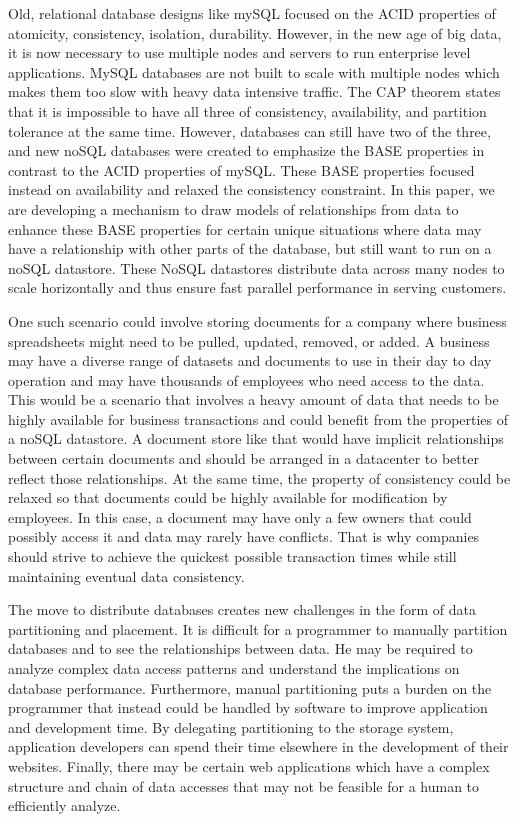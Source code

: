 \documentclass[10pt,final,journal]{IEEEtran}
\begin{document}
Old, relational database designs like mySQL focused on the ACID properties of atomicity, consistency, isolation, durability. However, in the new age of big data, it is now necessary to use multiple nodes and servers to run enterprise level applications. MySQL databases are not built to scale with multiple nodes which makes them too slow with heavy data intensive traffic. The CAP theorem states that it is impossible to have all three of consistency, availability, and partition tolerance at the same time. However, databases can still have two of the three, and new noSQL databases were created to emphasize the BASE properties in contrast to the ACID properties of mySQL. These BASE properties focused instead on availability and relaxed the consistency constraint. In this paper, we are developing a mechanism to draw models of relationships from data to enhance these BASE properties for certain unique situations where data may have a relationship with other parts of the database, but still want to run on a noSQL datastore. These NoSQL datastores distribute data across many nodes to scale horizontally and thus ensure fast parallel performance in serving customers.

One such scenario could involve storing documents for a company where business spreadsheets might need to be pulled, updated, removed, or added. A business may have a diverse range of datasets and documents to use in their day to day operation and may have thousands of employees who need access to the data. This would be a scenario that involves a heavy amount of data that needs to be highly available for business transactions and could benefit from the properties of a noSQL datastore. A document store like that would have implicit relationships between certain documents and should be arranged in a datacenter to better reflect those relationships. At the same time, the property of consistency could be relaxed so that documents could be highly available for modification by employees. In this case, a document may have only a few owners that could possibly access it and data may rarely have conflicts. That is why companies should strive to achieve the quickest possible transaction times while still maintaining eventual data consistency.

The move to distribute databases creates new challenges in the form of data partitioning and placement. It is difficult for a programmer to manually partition databases and to see the relationships between data. He may be required to analyze complex data access patterns and understand the implications on database performance. Furthermore, manual partitioning puts a burden on the programmer that instead could be handled by software to improve application and development time. By delegating partitioning to the storage system, application developers can spend their time elsewhere in the development of their websites. Finally, there may be certain web applications which have a complex structure and chain of data accesses that may not be feasible for a human to efficiently analyze.
\end{document}
